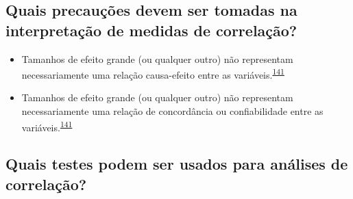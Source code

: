 \documentclass[
  a4paper,
]{book}
\begin{document}
\hypertarget{quais-precauuxe7uxf5es-devem-ser-tomadas-na-interpretauxe7uxe3o-de-medidas-de-correlauxe7uxe3o}{%
\subsection{Quais precauções devem ser tomadas na interpretação de medidas de correlação?}\label{quais-precauuxe7uxf5es-devem-ser-tomadas-na-interpretauxe7uxe3o-de-medidas-de-correlauxe7uxe3o}}

\begin{itemize}
\item
  Tamanhos de efeito grande (ou qualquer outro) não representam necessariamente uma relação causa-efeito entre as variáveis.\textsuperscript{\protect\hyperlink{ref-khamis2008}{141}}
\item
  Tamanhos de efeito grande (ou qualquer outro) não representam necessariamente uma relação de concordância ou confiabilidade entre as variáveis.\textsuperscript{\protect\hyperlink{ref-khamis2008}{141}}
\end{itemize}

\hypertarget{quais-testes-podem-ser-usados-para-anuxe1lises-de-correlauxe7uxe3o}{%
\subsection{Quais testes podem ser usados para análises de correlação?}\label{quais-testes-podem-ser-usados-para-anuxe1lises-de-correlauxe7uxe3o}}
\end{document}
